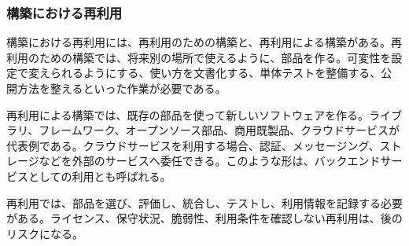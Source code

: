 \subsubsection{構築における再利用}

構築における再利用には、再利用のための構築と、再利用による構築がある。再利用のための構築では、将来別の場所で使えるように、部品を作る。可変性を設定で変えられるようにする、使い方を文書化する、単体テストを整備する、公開方法を整えるといった作業が必要である。

再利用による構築では、既存の部品を使って新しいソフトウェアを作る。ライブラリ、フレームワーク、オープンソース部品、商用既製品、クラウドサービスが代表例である。クラウドサービスを利用する場合、認証、メッセージング、ストレージなどを外部のサービスへ委任できる。このような形は、バックエンドサービスとしての利用とも呼ばれる。

再利用では、部品を選び、評価し、統合し、テストし、利用情報を記録する必要がある。ライセンス、保守状況、脆弱性、利用条件を確認しない再利用は、後のリスクになる。
